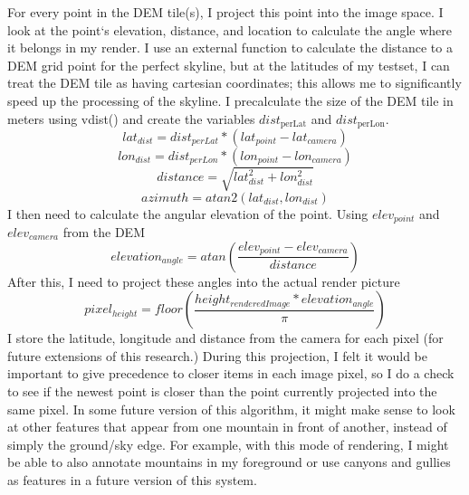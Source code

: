 \documentclass{acm_proc_article-sp}
\begin{document}
For every point in the DEM tile(s), I project this point into the image space.  I look at the point`s elevation, distance, and location to calculate the angle where it belongs in my render.  I use an external function \cite{vdist} to calculate the distance to a DEM grid point for the perfect skyline, but at the latitudes of my testset, I can treat the DEM tile as having cartesian coordinates; this allows me to significantly speed up the processing of the skyline\cite{behringer2002registration}.  I precalculate the size of the DEM tile in meters using vdist()\cite{vdist} and create the variables $dist_{\textrm{perLat}}$ and $dist_{\textrm{perLon}}$.
\begin{equation}
	lat_{dist} = dist_{perLat} * (lat_{point} - lat_{camera})
\label{eq:az1}
\end{equation}
\begin{equation}
	lon_{dist} = dist_{perLon} * (lon_{point} - lon_{camera})
\end{equation}
\begin{equation}
	distance = \sqrt{lat_{dist}^2 + lon_{dist}^2}
\end{equation}
\begin{equation}
	azimuth = atan2(lat_{dist}, lon_{dist})
\label{eq:azend}
\end{equation}
I then need to calculate the angular elevation of the point. Using $elev_{point}$ and $elev_{camera}$ from the DEM
\begin{equation}
	elevation_{angle} = atan(\frac{elev_{point} - elev_{camera}}{distance})
\end{equation}
After this, I need to project these angles into the actual render picture
\begin{equation}
	pixel_{height} = floor(\frac{height_{renderedImage} * elevation_{angle}}{\pi})
\end{equation}
I store the latitude, longitude and distance from the camera for each pixel (for future extensions of this research.) During this projection, I felt it would be important to give precedence to closer items in each image pixel, so I do a check to see if the newest point is closer than the point currently projected into the same pixel.  In some future version of this algorithm, it might make sense to look at other features that appear from one mountain in front of another, instead of simply the ground/sky edge. For example, with this mode of rendering, I might be able to also annotate mountains in my foreground or use canyons and gullies as features in a future version of this system.
\end{document}
